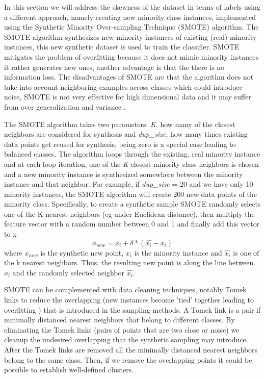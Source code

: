 \documentclass[11pt]{article}
\theoremstyle{definition}
\theoremstyle{remark}
\begin{document}
In this section we will address the skewness of the dataset in terms of labels using a different approach, namely creating new minority class instances, implemented using the Synthetic Minority Over-sampling Technique (SMOTE) algorithm. The SMOTE algorithm synthesizes new minority instances of existing (real) minority instances, this new synthetic dataset is used to train the classifier. SMOTE mitigates the problem of overfitting because it does not mimic minority instances it rather generates new ones, another advantage is that the there is no information loss. The disadvantages of SMOTE are that the algorithm does not take into account neighboring examples across classes which could introduce noise, SMOTE is not very effective for high dimensional data and it may suffer from  over generalization and variance \cite{wang2004imbalanced}.

The SMOTE algorithm takes two parameters: \textit{K}, how many of the closest neighbors are considered for synthesis and \textit{dup\_size}, how many times existing data points get reused for synthesis, being zero is a special case leading to balanced classes. The algorithm loops through the existing, real minority instance and at each loop iteration, one of the \textit{K} closest minority class neighbors is chosen and a new minority instance is synthesized somewhere between the minority instance and that neighbor. For example, if \textit{dup\_size} = 20 and we have only 10 minority instances, the SMOTE algorithm will create 200 new data points of the minority class. Specifically, to create a synthetic sample SMOTE randomly selects one of the K-nearest neighbors (eg under Euclidean distance), then multiply the feature vector with a random number between 0 and 1 and finally add this vector to x
\begin{equation}
x_{new} =  x_i + \delta * (\hat{x_i} - x_i)
\end{equation}
where $x_{new}$ is the synthetic new point, $x_i$ is the minority instance and $\hat{x_i}$ is one of the k nearest neighbors. Thus, the resulting new point is along the line between $x_i$ and the randomly selected neighbor $\hat{x_i}$. 
 
SMOTE can be complemented with data cleaning techniques, notably Tomek links \cite{tomek1976two} to reduce the overlapping (new instances become 'tied' together leading to overfitting \cite{mease2007boosted}) that is introduced in the sampling methods.
A Tomek link is a pair if minimally distanced nearest neighbors that belong to different classes. By eliminating the Tomek links (pairs of points that are two close or noise) we cleanup the undesired overlapping that the synthetic sampling may introduce. After the Tomek links are removed all the minimally distanced nearest neighbors belong to the same class. Then, if we remove the overlapping points it could be possible to establish well-defined clusters. 
\end{document}
